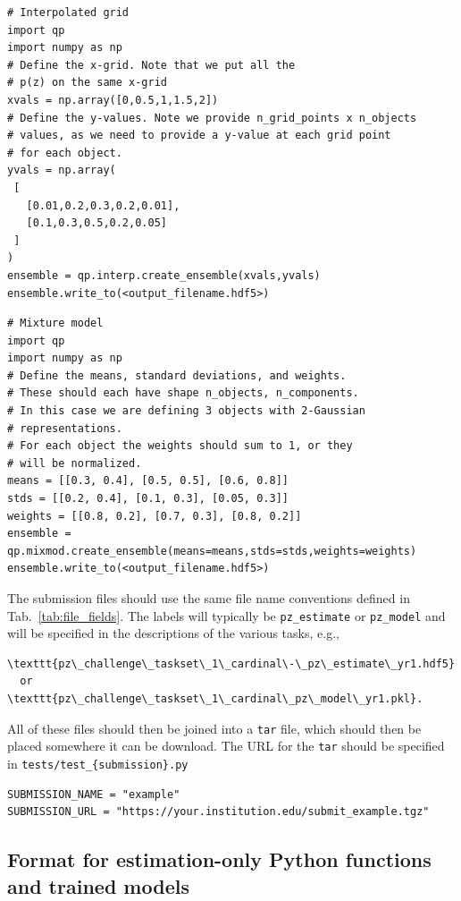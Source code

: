 \begin{verbatim}
# Interpolated grid
import qp
import numpy as np
# Define the x-grid. Note that we put all the
# p(z) on the same x-grid
xvals = np.array([0,0.5,1,1.5,2])
# Define the y-values. Note we provide n_grid_points x n_objects 
# values, as we need to provide a y-value at each grid point 
# for each object.
yvals = np.array(
 [
   [0.01,0.2,0.3,0.2,0.01],
   [0.1,0.3,0.5,0.2,0.05]
 ]
)
ensemble = qp.interp.create_ensemble(xvals,yvals)
ensemble.write_to(<output_filename.hdf5>)
\end{verbatim}

\begin{verbatim}
# Mixture model
import qp
import numpy as np
# Define the means, standard deviations, and weights.
# These should each have shape n_objects, n_components.
# In this case we are defining 3 objects with 2-Gaussian 
# representations.
# For each object the weights should sum to 1, or they
# will be normalized.
means = [[0.3, 0.4], [0.5, 0.5], [0.6, 0.8]]
stds = [[0.2, 0.4], [0.1, 0.3], [0.05, 0.3]]
weights = [[0.8, 0.2], [0.7, 0.3], [0.8, 0.2]]
ensemble = qp.mixmod.create_ensemble(means=means,stds=stds,weights=weights)
ensemble.write_to(<output_filename.hdf5>)
\end{verbatim}

The submission files should use the same file name conventions defined
in Tab.~\ref{tab:file_fields}. The labels will typically be
\texttt{pz\_estimate} or \texttt{pz\_model} and will be specified in
the descriptions of the various tasks, e.g.,

\begin{verbatim}
\texttt{pz\_challenge\_taskset\_1\_cardinal\-\_pz\_estimate\_yr1.hdf5}
  or
\texttt{pz\_challenge\_taskset\_1\_cardinal\_pz\_model\_yr1.pkl}.
\end{verbatim}

All of these files should then be joined into a \texttt{tar} file, which 
should then be placed somewhere it can be download.  The URL for the
\texttt{tar} should be specified in
\texttt{tests/test\_\{submission\}.py}

\begin{verbatim}
SUBMISSION_NAME = "example"
SUBMISSION_URL = "https://your.institution.edu/submit_example.tgz"
\end{verbatim}


\subsection{Format for estimation-only Python functions and trained models}

